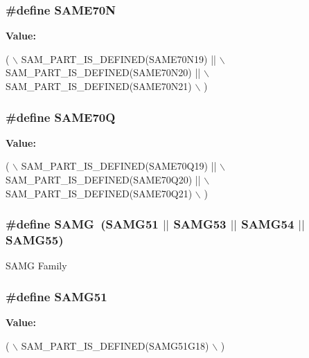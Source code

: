 \subsubsection[{S\+A\+M\+E70\+N}]{\setlength{\rightskip}{0pt plus 5cm}\#define S\+A\+M\+E70\+N}\label{group__sam__part__macros__group_gaaf095995f64c3f7f90b0bc0bba4f02c1}
{\bfseries Value\+:}
\begin{DoxyCode}
( \(\backslash\)
        SAM\_PART\_IS\_DEFINED(SAME70N19) || \(\backslash\)
        SAM\_PART\_IS\_DEFINED(SAME70N20) || \(\backslash\)
        SAM\_PART\_IS\_DEFINED(SAME70N21) \(\backslash\)
    )
\end{DoxyCode}
\hypertarget{group__sam__part__macros__group_gabff43edc4525eee01f0a484e6e3996e9}{}
\subsubsection[{S\+A\+M\+E70\+Q}]{\setlength{\rightskip}{0pt plus 5cm}\#define S\+A\+M\+E70\+Q}\label{group__sam__part__macros__group_gabff43edc4525eee01f0a484e6e3996e9}
{\bfseries Value\+:}
\begin{DoxyCode}
( \(\backslash\)
        SAM\_PART\_IS\_DEFINED(SAME70Q19) || \(\backslash\)
        SAM\_PART\_IS\_DEFINED(SAME70Q20) || \(\backslash\)
        SAM\_PART\_IS\_DEFINED(SAME70Q21) \(\backslash\)
    )
\end{DoxyCode}
\hypertarget{group__sam__part__macros__group_gad4ae7782abc1e1087067d9958af3381c}{}
\subsubsection[{S\+A\+M\+G}]{\setlength{\rightskip}{0pt plus 5cm}\#define S\+A\+M\+G~(S\+A\+M\+G51 $\vert$$\vert$ S\+A\+M\+G53 $\vert$$\vert$ S\+A\+M\+G54 $\vert$$\vert$ S\+A\+M\+G55)}\label{group__sam__part__macros__group_gad4ae7782abc1e1087067d9958af3381c}
S\+A\+M\+G Family \hypertarget{group__sam__part__macros__group_gacd7261d3389d2f5c745e64ffe1b89d99}{}
\subsubsection[{S\+A\+M\+G51}]{\setlength{\rightskip}{0pt plus 5cm}\#define S\+A\+M\+G51}\label{group__sam__part__macros__group_gacd7261d3389d2f5c745e64ffe1b89d99}
{\bfseries Value\+:}
\begin{DoxyCode}
( \(\backslash\)
        SAM\_PART\_IS\_DEFINED(SAMG51G18) \(\backslash\)
        )
\end{DoxyCode}
\hypertarget{group__sam__part__macros__group_gaee5167c2eae38c830d175d48769391d8}{}
